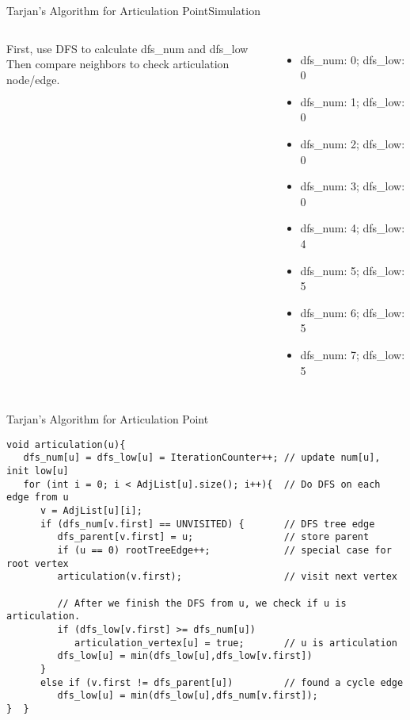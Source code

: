 \begin{frame}{Tarjan's Algorithm for Articulation Point}{Simulation}
  \begin{columns}
    First, use DFS to calculate dfs\_num and dfs\_low\\
    Then compare neighbors to check articulation node/edge.
    \begin{itemize}
      \item dfs\_num: 0; dfs\_low: 0
      \item dfs\_num: 1; dfs\_low: 0
      \item dfs\_num: 2; dfs\_low: 0
      \item dfs\_num: 3; dfs\_low: 0
      \item dfs\_num: 4; dfs\_low: 4
      \item dfs\_num: 5; dfs\_low: 5
      \item dfs\_num: 6; dfs\_low: 5
      \item dfs\_num: 7; dfs\_low: 5
    \end{itemize}
  \end{columns}
\end{frame}

\begin{frame}[fragile]{Tarjan's Algorithm for Articulation Point}
  
{\smaller
  \begin{exampleblock}{}
\begin{verbatim}
void articulation(u){
   dfs_num[u] = dfs_low[u] = IterationCounter++; // update num[u], init low[u]
   for (int i = 0; i < AdjList[u].size(); i++){  // Do DFS on each edge from u
      v = AdjList[u][i];
      if (dfs_num[v.first] == UNVISITED) {       // DFS tree edge
         dfs_parent[v.first] = u;                // store parent
         if (u == 0) rootTreeEdge++;             // special case for root vertex
         articulation(v.first);                  // visit next vertex

         // After we finish the DFS from u, we check if u is articulation.
         if (dfs_low[v.first] >= dfs_num[u])
            articulation_vertex[u] = true;       // u is articulation
         dfs_low[u] = min(dfs_low[u],dfs_low[v.first])
      }
      else if (v.first != dfs_parent[u])         // found a cycle edge
         dfs_low[u] = min(dfs_low[u],dfs_num[v.first]);
}  }
\end{verbatim}
  \end{exampleblock}}
\end{frame}


